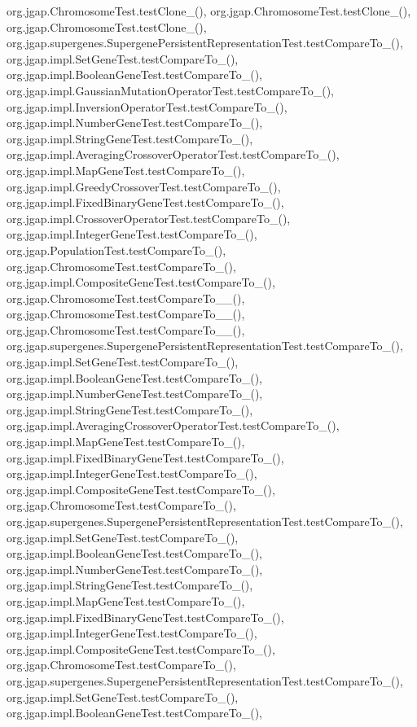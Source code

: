 org.\-jgap.\-Chromosome\-Test.\-test\-Clone\-\_(), org.\-jgap.\-Chromosome\-Test.\-test\-Clone\-\_(), org.\-jgap.\-Chromosome\-Test.\-test\-Clone\-\_(), org.\-jgap.\-supergenes.\-Supergene\-Persistent\-Representation\-Test.\-test\-Compare\-To\-\_(), org.\-jgap.\-impl.\-Set\-Gene\-Test.\-test\-Compare\-To\-\_(), org.\-jgap.\-impl.\-Boolean\-Gene\-Test.\-test\-Compare\-To\-\_(), org.\-jgap.\-impl.\-Gaussian\-Mutation\-Operator\-Test.\-test\-Compare\-To\-\_(), org.\-jgap.\-impl.\-Inversion\-Operator\-Test.\-test\-Compare\-To\-\_(), org.\-jgap.\-impl.\-Number\-Gene\-Test.\-test\-Compare\-To\-\_(), org.\-jgap.\-impl.\-String\-Gene\-Test.\-test\-Compare\-To\-\_(), org.\-jgap.\-impl.\-Averaging\-Crossover\-Operator\-Test.\-test\-Compare\-To\-\_(), org.\-jgap.\-impl.\-Map\-Gene\-Test.\-test\-Compare\-To\-\_(), org.\-jgap.\-impl.\-Greedy\-Crossover\-Test.\-test\-Compare\-To\-\_(), org.\-jgap.\-impl.\-Fixed\-Binary\-Gene\-Test.\-test\-Compare\-To\-\_(), org.\-jgap.\-impl.\-Crossover\-Operator\-Test.\-test\-Compare\-To\-\_(), org.\-jgap.\-impl.\-Integer\-Gene\-Test.\-test\-Compare\-To\-\_(), org.\-jgap.\-Population\-Test.\-test\-Compare\-To\-\_(), org.\-jgap.\-Chromosome\-Test.\-test\-Compare\-To\-\_(), org.\-jgap.\-impl.\-Composite\-Gene\-Test.\-test\-Compare\-To\-\_(), org.\-jgap.\-Chromosome\-Test.\-test\-Compare\-To\-\_\-\_(), org.\-jgap.\-Chromosome\-Test.\-test\-Compare\-To\-\_\-\_(), org.\-jgap.\-Chromosome\-Test.\-test\-Compare\-To\-\_\-\_(), org.\-jgap.\-supergenes.\-Supergene\-Persistent\-Representation\-Test.\-test\-Compare\-To\-\_(), org.\-jgap.\-impl.\-Set\-Gene\-Test.\-test\-Compare\-To\-\_(), org.\-jgap.\-impl.\-Boolean\-Gene\-Test.\-test\-Compare\-To\-\_(), org.\-jgap.\-impl.\-Number\-Gene\-Test.\-test\-Compare\-To\-\_(), org.\-jgap.\-impl.\-String\-Gene\-Test.\-test\-Compare\-To\-\_(), org.\-jgap.\-impl.\-Averaging\-Crossover\-Operator\-Test.\-test\-Compare\-To\-\_(), org.\-jgap.\-impl.\-Map\-Gene\-Test.\-test\-Compare\-To\-\_(), org.\-jgap.\-impl.\-Fixed\-Binary\-Gene\-Test.\-test\-Compare\-To\-\_(), org.\-jgap.\-impl.\-Integer\-Gene\-Test.\-test\-Compare\-To\-\_(), org.\-jgap.\-impl.\-Composite\-Gene\-Test.\-test\-Compare\-To\-\_(), org.\-jgap.\-Chromosome\-Test.\-test\-Compare\-To\-\_(), org.\-jgap.\-supergenes.\-Supergene\-Persistent\-Representation\-Test.\-test\-Compare\-To\-\_(), org.\-jgap.\-impl.\-Set\-Gene\-Test.\-test\-Compare\-To\-\_(), org.\-jgap.\-impl.\-Boolean\-Gene\-Test.\-test\-Compare\-To\-\_(), org.\-jgap.\-impl.\-Number\-Gene\-Test.\-test\-Compare\-To\-\_(), org.\-jgap.\-impl.\-String\-Gene\-Test.\-test\-Compare\-To\-\_(), org.\-jgap.\-impl.\-Map\-Gene\-Test.\-test\-Compare\-To\-\_(), org.\-jgap.\-impl.\-Fixed\-Binary\-Gene\-Test.\-test\-Compare\-To\-\_(), org.\-jgap.\-impl.\-Integer\-Gene\-Test.\-test\-Compare\-To\-\_(), org.\-jgap.\-impl.\-Composite\-Gene\-Test.\-test\-Compare\-To\-\_(), org.\-jgap.\-Chromosome\-Test.\-test\-Compare\-To\-\_(), org.\-jgap.\-supergenes.\-Supergene\-Persistent\-Representation\-Test.\-test\-Compare\-To\-\_(), org.\-jgap.\-impl.\-Set\-Gene\-Test.\-test\-Compare\-To\-\_(), org.\-jgap.\-impl.\-Boolean\-Gene\-Test.\-test\-Compare\-To\-\_(), 